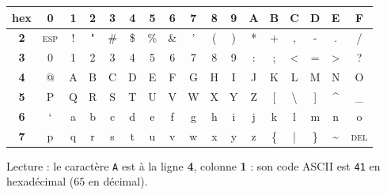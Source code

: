 \begin{center}
\footnotesize
\setlength{\tabcolsep}{3pt}
\renewcommand{\arraystretch}{1.3}
\begin{tabular}{|c|*{16}{c|}}
\hline
\textbf{hex} & \textbf{0} & \textbf{1} & \textbf{2} & \textbf{3} & \textbf{4} & \textbf{5} & \textbf{6} & \textbf{7} & \textbf{8} & \textbf{9} & \textbf{A} & \textbf{B} & \textbf{C} & \textbf{D} & \textbf{E} & \textbf{F} \\ \hline
\textbf{2} & \textsc{esp} & ! & " & \# & \$ & \% & \& & ' & ( & ) & * & + & , & - & . & / \\ \hline
\textbf{3} & 0 & 1 & 2 & 3 & 4 & 5 & 6 & 7 & 8 & 9 & : & ; & < & = & > & ? \\ \hline
\textbf{4} & @ & A & B & C & D & E & F & G & H & I & J & K & L & M & N & O \\ \hline
\textbf{5} & P & Q & R & S & T & U & V & W & X & Y & Z & [ & \textbackslash & ] & \^{} & \_ \\ \hline
\textbf{6} & ` & a & b & c & d & e & f & g & h & i & j & k & l & m & n & o \\ \hline
\textbf{7} & p & q & r & s & t & u & v & w & x & y & z & \{ & | & \} & \textasciitilde & \textsc{del} \\ \hline
\end{tabular}

\smallskip
Lecture : le caractère \texttt{A} est à la ligne \textbf{4}, colonne \textbf{1} : son code ASCII est \texttt{41} en hexadécimal ($65$ en décimal).
\end{center}
